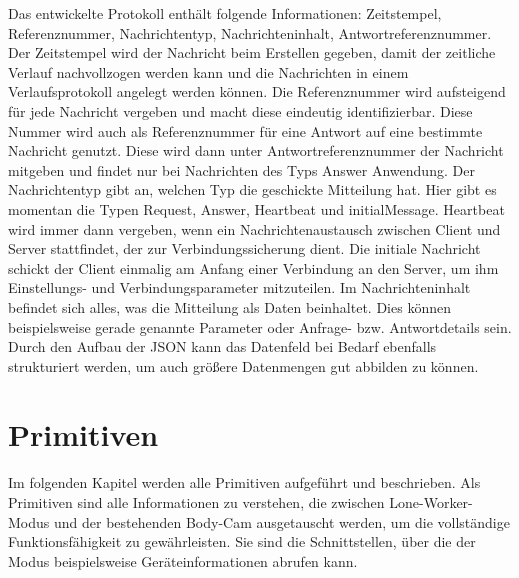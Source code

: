 \documentclass[thesis.tex]{subfiles}
\begin{document}
Das entwickelte Protokoll enthält folgende Informationen: Zeitstempel, Referenznummer, Nachrichtentyp, Nachrichteninhalt, Antwortreferenznummer.
Der Zeitstempel wird der Nachricht beim Erstellen gegeben, damit der zeitliche Verlauf nachvollzogen werden kann und die Nachrichten in einem Verlaufsprotokoll angelegt werden können.
Die Referenznummer wird aufsteigend für jede Nachricht vergeben und macht diese eindeutig identifizierbar.
Diese Nummer wird auch als Referenznummer für eine Antwort auf eine bestimmte Nachricht genutzt.
Diese wird dann unter Antwortreferenznummer der Nachricht mitgeben und findet nur bei Nachrichten des Typs Answer Anwendung.
Der Nachrichtentyp gibt an, welchen Typ die geschickte Mitteilung hat.
Hier gibt es momentan die Typen Request, Answer, Heartbeat und initialMessage.
Heartbeat wird immer dann vergeben, wenn ein Nachrichtenaustausch zwischen Client und Server stattfindet, der zur Verbindungssicherung dient.
Die initiale Nachricht schickt der Client einmalig am Anfang einer Verbindung an den Server, um ihm Einstellungs- und Verbindungsparameter mitzuteilen.
Im Nachrichteninhalt befindet sich alles, was die Mitteilung als Daten beinhaltet.
Dies können beispielsweise gerade genannte Parameter oder Anfrage- bzw. Antwortdetails sein.
Durch den Aufbau der JSON kann das Datenfeld bei Bedarf ebenfalls strukturiert werden, um auch größere Datenmengen gut abbilden zu können.

\section{Primitiven}\label{chap:primitiven}
Im folgenden Kapitel werden alle Primitiven aufgeführt und beschrieben.
Als Primitiven sind alle Informationen zu verstehen, die zwischen Lone-Worker-Modus und der bestehenden Body-Cam ausgetauscht werden, um die vollständige Funktionsfähigkeit zu gewährleisten.
Sie sind die Schnittstellen, über die der Modus beispielsweise Geräteinformationen abrufen kann.
\end{document}
